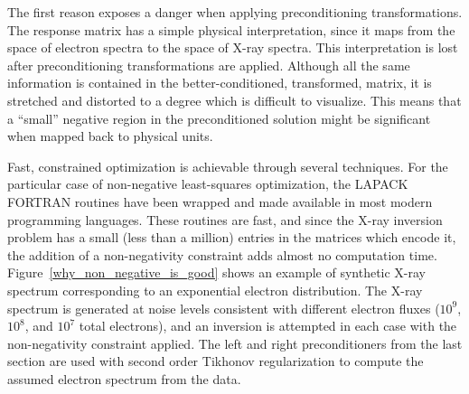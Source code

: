 The first reason exposes a danger when applying preconditioning transformations. The response matrix has a simple physical interpretation, since it maps from the space of electron spectra to the space of X-ray spectra. This interpretation is lost after preconditioning transformations are applied. Although all the same information is contained in the better-conditioned, transformed, matrix, it is stretched and distorted to a degree which is difficult to visualize. This means that a ``small'' negative region in the preconditioned solution might be significant when mapped back to physical units. 

Fast, constrained optimization is achievable through several techniques. For the particular case of non-negative least-squares optimization, the LAPACK FORTRAN routines have been wrapped and made available in most modern programming languages. These routines are fast, and since the X-ray inversion problem has a small (less than a million) entries in the matrices which encode it, the addition of a non-negativity constraint adds almost no computation time. 
Figure~\ref{why_non_negative_is_good} shows an example of synthetic X-ray spectrum corresponding to an exponential electron distribution. The X-ray spectrum is generated at noise levels consistent with different electron fluxes ($10^9$, $10^8$, and $10^7$ total electrons), and an inversion is attempted in each case with the non-negativity constraint applied. The left and right preconditioners from the last section are used with second order Tikhonov regularization to compute the assumed electron spectrum from the data. 


